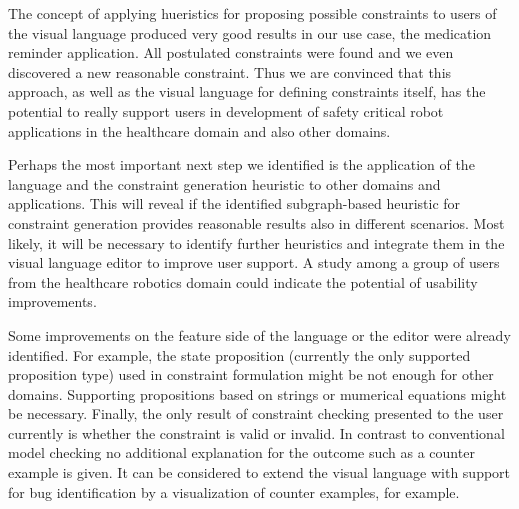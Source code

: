 \documentclass[conference]{IEEEtran}
\begin{document}
The concept of applying hueristics for proposing possible constraints to users of the visual language produced very good results in our use case, the medication reminder application. All postulated constraints were found and we even discovered a new reasonable constraint. Thus we are convinced that this approach, as well as the visual language for defining constraints itself, has the potential to really support users in development of safety critical robot applications in the healthcare domain and also other domains.

Perhaps the most important next step we identified is the application of the language and the constraint generation heuristic to other domains and applications. This will reveal if the identified subgraph-based heuristic for constraint generation provides reasonable results also in different scenarios. Most likely, it will be necessary to identify further heuristics and integrate them in the visual language editor to improve user support. A study among a group of users from the healthcare robotics domain could indicate the potential of usability improvements.

Some improvements on the feature side of the language or the editor were already identified. For example, the state proposition (currently the only supported proposition type) used in constraint formulation might be not enough for other domains. Supporting propositions based on strings or mumerical equations might be necessary. Finally, the only result of constraint checking presented to the user currently is whether the constraint is valid or invalid. In contrast to conventional model checking no additional explanation for the outcome such as a counter example is given. It can be considered to extend the visual language with support for bug identification by a visualization of counter examples, for example.


\end{document}
